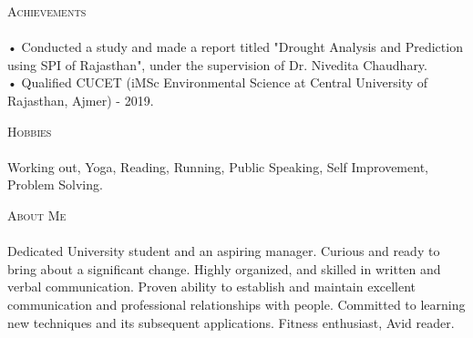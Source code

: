 \documentclass[a4paper]{article}
\newcommand{\lineunder} {
    \vspace*{-8pt} \\
    \hspace*{-18pt} \hrulefill \\
}
\newcommand{\header} [1] {
    {\hspace*{-18pt}\vspace*{6pt} \textsc{#1}}
    \vspace*{-6pt} \lineunder
}
\begin{document}
\header{Achievements}
      \vspace{2mm} 
    • Conducted a study and made a report titled "Drought Analysis and Prediction using SPI of Rajasthan", under the supervision of Dr. Nivedita Chaudhary.\\
    • Qualified CUCET (iMSc Environmental Science at Central University of Rajasthan, Ajmer) - 2019.\\
\vspace*{2mm}

\header{Hobbies}
      \vspace{2mm}
      Working out, Yoga, Reading, Running, Public Speaking, Self Improvement, Problem Solving.\\ 
\vspace*{2mm} 
\header{About Me}
      \vspace{2mm}
      Dedicated University student and an aspiring manager. Curious and ready to bring about a significant change.  Highly organized, and skilled in written and verbal communication. Proven ability to establish and maintain excellent communication and professional relationships with people. Committed to learning new techniques and its subsequent applications. Fitness enthusiast, Avid reader.  
\vspace*{2mm}
    
\end{document}
